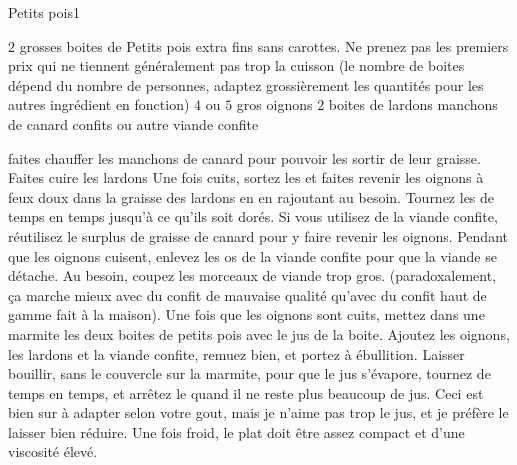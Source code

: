 \begin{recette}{Petits pois}{1}{}{}
\begin{ingredients}
\ingredient $2$ grosses boites de Petits pois extra fins sans carottes. Ne prenez pas les premiers prix qui ne tiennent généralement pas trop la cuisson (le nombre de boites dépend du nombre de personnes, adaptez grossièrement les quantités pour les autres ingrédient en fonction)
\ingredient $4$ ou $5$ gros oignons
\ingredient $2$ boites de lardons
\ingredient manchons de canard confits ou autre viande confite
\end{ingredients}

\begin{preparation}
\etape faites chauffer les manchons de canard pour pouvoir les sortir de leur graisse.
\etape Faites cuire les lardons
\etape Une fois cuits, sortez les et faites revenir les oignons à feux doux dans la graisse des lardons en en rajoutant au besoin. Tournez les de temps en temps jusqu'à ce qu'ils soit dorés. Si vous utilisez de la viande confite, réutilisez le surplus de graisse de canard pour y faire revenir les oignons.
\etape Pendant que les oignons cuisent, enlevez les os de la viande confite pour que la viande se détache. Au besoin, coupez les morceaux de viande trop gros. (paradoxalement, ça marche mieux avec du confit de mauvaise qualité qu'avec du confit haut de gamme fait à la maison).
\etape Une fois que les oignons sont cuits, mettez dans une marmite les deux boites de petits pois avec le jus de la boite. Ajoutez les oignons, les lardons et la viande confite, remuez bien, et portez à ébullition.
\etape Laisser bouillir, sans le couvercle sur la marmite, pour que le jus s'évapore, tournez de temps en temps, et arrêtez le quand il ne reste plus beaucoup de jus. Ceci est bien sur à adapter selon votre gout, mais je n'aime pas trop le jus, et je préfère le laisser bien réduire. Une fois froid, le plat doit être assez compact et d'une viscosité élevé.
\end{preparation}

\end{recette}

